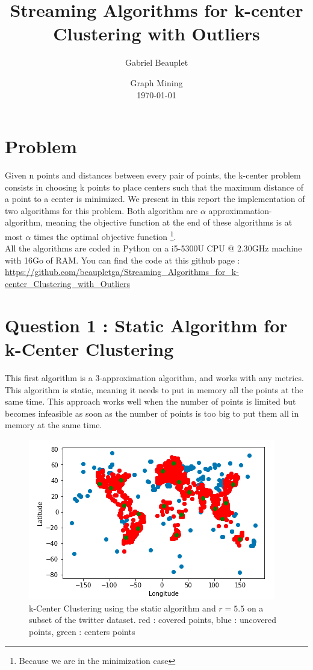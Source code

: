 \documentclass[a4paper,11pt,openany]{article}
\title{Streaming Algorithms for k-center Clustering with Outliers}
\author{Gabriel Beauplet}
\date{%
    Graph Mining\\%
    \today
}
\begin{document}
\maketitle

\section*{Problem}
\noindent
Given n points and distances between every pair of points, the k-center problem consists in choosing k points to place centers such that the maximum distance of a point to a center is minimized. We present in this report the implementation of two algorithms for this problem. Both algorithm are $\alpha$ approximmation-algorithm, meaning the objective function at the end of these algorithms is at most $\alpha$ times the optimal objective function \footnote{Because we are in the minimization case}.\\
All the algorithms are coded in Python on a i5-5300U CPU @ 2.30GHz machine with 16Go of RAM. You can find the code at this github page : \url{https://github.com/beaupletga/Streaming_Algorithms_for_k-center_Clustering_with_Outliers}

\section*{Question 1 : Static Algorithm for k-Center Clustering}
\noindent
This first algorithm \cite{static} is a 3-approximation algorithm, and works with any metrics. This algorithm is static, meaning it needs to put in memory all the points at the same time. This approach works well when the number of points is limited but becomes infeasible as soon as the number of points is too big to put them all in memory at the same time.\\

\begin{figure}[H]
\begin{center}
\includegraphics[scale=0.8]{Images/static}
\caption{k-Center Clustering using the static algorithm and $r=5.5$ on a subset of the twitter dataset. red : covered points, blue : uncovered points, green : centers points}
\label{fig:static}
\end{center}
\end{figure}
\end{document}
